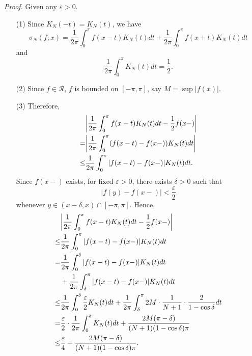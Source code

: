 \documentclass{article}
\begin{document}
\emph{Proof.}
Given any $\varepsilon > 0$.
\begin{enumerate}
\item[(1)]
Since $K_N(-t) = K_N(t)$, we have
\[
  \sigma_N(f;x)
  = \frac{1}{2\pi} \int_{0}^{\pi} f(x-t)K_N(t)dt
    + \frac{1}{2\pi} \int_{0}^{\pi} f(x+t)K_N(t)dt
\]
and
\[
  \frac{1}{2\pi} \int_{0}^{\pi} K_N(t)dt = \frac{1}{2}.
\]

\item[(2)]
Since $f \in \mathscr{R}$,
$f$ is bounded on $[-\pi,\pi]$, say $M = \sup|f(x)|$.

\item[(3)]
Therefore,
  \begin{align*}
    &\abs{ \frac{1}{2\pi} \int_{0}^{\pi} f(x-t)K_N(t)dt - \frac{1}{2} f(x-) } \\
    =& \abs{ \frac{1}{2\pi} \int_{0}^{\pi} (f(x-t)-f(x-))K_N(t)dt } \\
    \leq& \frac{1}{2\pi} \int_{0}^{\pi} |f(x-t)-f(x-)|K_N(t)dt.
  \end{align*}
Since $f(x-)$ exists,
for fixed $\varepsilon > 0$, there exists $\delta > 0$
such that
\[
  |f(y) - f(x-)| < \frac{\varepsilon}{2}
\]
whenever $y \in (x-\delta,x) \cap [-\pi,\pi]$.
Hence,
  \begin{align*}
    &\abs{ \frac{1}{2\pi} \int_{0}^{\pi} f(x-t)K_N(t)dt - \frac{1}{2} f(x-) } \\
    \leq& \frac{1}{2\pi} \int_{0}^{\pi} |f(x-t)-f(x-)|K_N(t)dt \\
    =& \frac{1}{2\pi} \int_{0}^{\delta} |f(x-t)-f(x-)|K_N(t)dt \\
      &+ \frac{1}{2\pi} \int_{\delta}^{\pi} |f(x-t)-f(x-)|K_N(t)dt \\
    \leq& \frac{1}{2\pi} \int_{0}^{\delta} \frac{\varepsilon}{2} K_N(t)dt
      + \frac{1}{2\pi} \int_{\delta}^{\pi} 2M \cdot \frac{1}{N+1} \cdot \frac{2}{1-\cos \delta} dt \\
    =& \frac{\varepsilon}{2} \cdot \frac{1}{2\pi} \int_{0}^{\delta} K_N(t)dt
      + \frac{2M(\pi-\delta)}{(N+1)(1-\cos \delta)\pi} \\
    \leq& \frac{\varepsilon}{4} + \frac{2M(\pi-\delta)}{(N+1)(1-\cos \delta)\pi}. \\
  \end{align*}


\end{enumerate}
\end{document}
